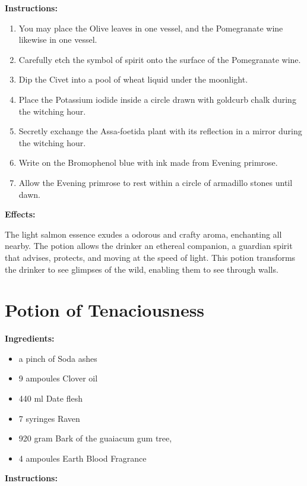 \documentclass{article}
\begin{document}
\textbf{Instructions:}

\begin{enumerate}
  \item You may place the Olive leaves in one vessel, and the Pomegranate wine likewise in one vessel.
  \item Carefully etch the symbol of spirit onto the surface of the Pomegranate wine.
  \item Dip the Civet into a pool of wheat liquid under the moonlight.
  \item Place the Potassium iodide inside a circle drawn with goldcurb chalk during the witching hour.
  \item Secretly exchange the Assa-foetida plant with its reflection in a mirror during the witching hour.
  \item Write on the Bromophenol blue with ink made from Evening primrose.
  \item Allow the Evening primrose to rest within a circle of armadillo stones until dawn.
\end{enumerate}

\textbf{Effects:}

The light salmon essence exudes a odorous and crafty aroma, enchanting all nearby. The potion allows the drinker an ethereal companion, a guardian spirit that advises, protects, and moving at the speed of light. This potion transforms the drinker to see glimpses of the wild, enabling them to see through walls.

\newpage
\section*{Potion of Tenaciousness}

\textbf{Ingredients:}

\begin{itemize}
  \item a pinch of Soda ashes
  \item 9 ampoules Clover oil
  \item 440 ml Date flesh
  \item 7 syringes Raven
  \item 920 gram Bark of the guaiacum gum tree,
  \item 4 ampoules Earth Blood Fragrance
\end{itemize}

\textbf{Instructions:}
\end{document}
